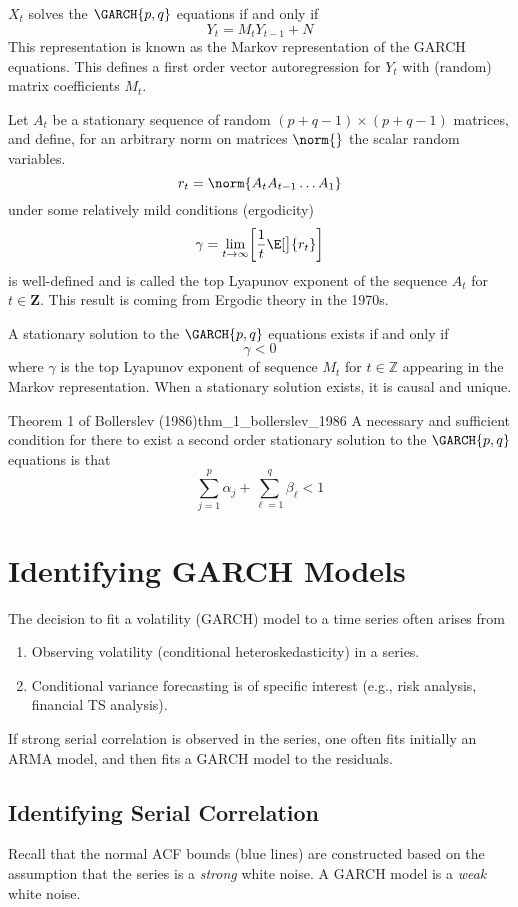 \begin{Theorem}{}{}
    $X_{t}$ solves the $ \GARCH{p,q} $ equations if and only if
    \[
        Y_{t}=M_{t} Y_{t-1}+N
    \]
    This representation is known as the Markov representation of the GARCH equations.
    This defines a first order vector autoregression for $Y_{t}$ with
    (random) matrix coefficients $M_{t}$.
\end{Theorem}
Let $A_{t}$ be a stationary sequence of random $(p+q-1) \times (p+q-1)$ matrices, and define,
for an arbitrary norm on matrices $\norm{}$ the scalar random variables.
\[ r_{t}=\norm{A_{t} A_{t-1} \ldots A_{1}} \]
under some relatively mild conditions (ergodicity)
\[ \gamma=\lim\limits_{{t} \to {\infty}}\biggl[\frac{1}{t} \E[\big]{\log{r_{t}}}\biggr] \]
is well-defined and is called the top Lyapunov exponent of the sequence
$A_{t}$ for $t \in \mathbf{Z}$.
This result is coming from Ergodic theory in the 1970s.
\begin{Theorem}{}{}
    A stationary solution to the $ \GARCH{p,q} $ equations exists if and only if
    \[ \gamma<0 \]
    where $\gamma$ is the top Lyapunov exponent of sequence
    $M_{t}$ for $t \in \mathbb{Z}$ appearing in the Markov representation.
    When a stationary solution exists, it is causal and unique.
\end{Theorem}
\begin{Theorem}{Theorem 1 of Bollerslev (1986)}{thm_1_bollerslev_1986}
    A necessary and sufficient condition for there to exist a second order stationary
    solution to the $ \GARCH{p,q} $ equations is that
    \[ \sum_{j=1}^{p} \alpha_{j}+\sum_{\ell=1}^{q} \beta_{\ell}<1 \]
\end{Theorem}

\section{Identifying GARCH Models}
The decision to fit a volatility (GARCH) model to a time series often
arises from
\begin{enumerate}[(1)]
    \item Observing volatility (conditional heteroskedasticity)
          in a series.
    \item Conditional variance forecasting is of specific interest
          (e.g., risk analysis, financial TS analysis).
\end{enumerate}
If strong serial correlation is observed in the series, one
often fits initially an ARMA model, and then
fits a GARCH model to the residuals.
\subsection*{Identifying Serial Correlation}
Recall that the normal ACF bounds (blue lines)
are constructed based on the assumption that
the series is a \emph{strong} white noise. A GARCH
model is a \emph{weak} white noise.

